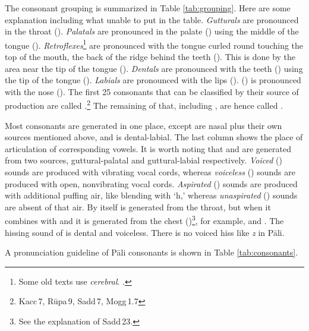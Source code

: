 The consonant grouping is summarized in Table \ref{tab:grouping}. Here are some explanation including what unable to put in the table. \emph{Gutturals} are pronounced in the throat (). \emph{Palatals} are pronounced in the palate () using the middle of the tongue (). \emph{Retroflexes}\footnote{Some old texts use \emph{cerebral}. \citealp[See also][p.~3]{warder:intro}.} are pronounced with the tongue curled round touching the top of the mouth, the back of the ridge behind the teeth (). This is done by the area near the tip of the tongue (). \emph{Dentals} are pronounced with the teeth () using the tip of the tongue (). \emph{Labials} are pronounced with the lips ().  () is pronounced with the nose (). The first 25 consonants that can be classified by their source of production are called .\footnote{Kacc\,7, R\=upa\,9, Sadd\,7, Mogg\,1.7} The remaining of that, including , are hence called .

Most consonants are generated in one place, except  are nasal plus their own sources mentioned above, and  is dental-labial. The last column shows the place of articulation of corresponding vowels. It is worth noting that  and  are generated from two sources, guttural-palatal and guttural-labial respectively. \emph{Voiced} () sounds are produced with vibrating vocal cords, whereas \emph{voiceless} () sounds are produced with open, nonvibrating vocal cords. \emph{Aspirated} () sounds are produced with additional puffing air, like blending with `h,' whereas \emph{unaspirated} () sounds are absent of that air. By itself  is generated from the throat, but when it combines with  and  it is generated from the chest ()\footnote{See the explanation of Sadd\,23.}, for example,  and . The hissing sound of  is dental and voiceless. There is no voiced hiss like \emph{z} in P\=ali.

A pronunciation guideline of P\=ali consonants is shown in Table \ref{tab:consonants}.

